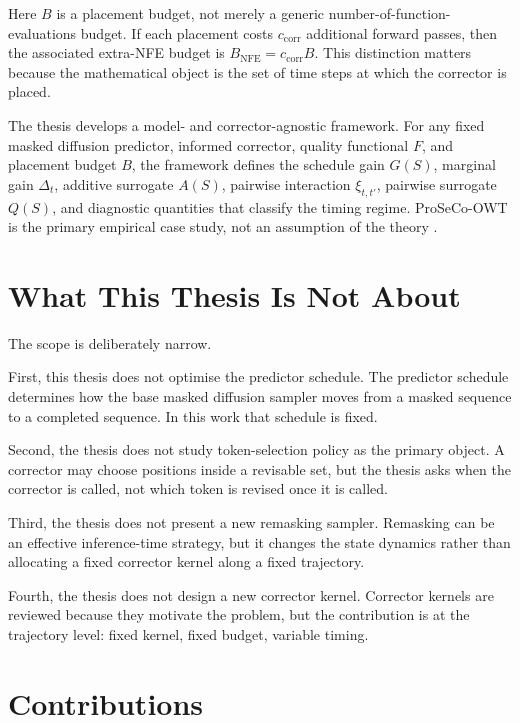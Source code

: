 Here $B$ is a placement budget, not merely a generic number-of-function-
evaluations budget. If each placement costs $c_{\mathrm{corr}}$ additional
forward passes, then the associated extra-NFE budget is
$B_{\mathrm{NFE}} = c_{\mathrm{corr}}B$. This distinction matters because the
mathematical object is the set of time steps at which the corrector is placed.

The thesis develops a model- and corrector-agnostic framework. For any fixed
masked diffusion predictor, informed corrector, quality functional $F$, and
placement budget $B$, the framework defines the schedule gain $G(S)$, marginal
gain $\Delta_t$, additive surrogate $A(S)$, pairwise interaction
$\xi_{t,t'}$, pairwise surrogate $Q(S)$, and diagnostic quantities that
classify the timing regime. ProSeCo-OWT is the primary empirical case study,
not an assumption of the theory \parencite{schiff2026proseco}.

\section{What This Thesis Is Not About}
\label{sec:ch1-non-goals}

The scope is deliberately narrow.

First, this thesis does not optimise the predictor schedule. The predictor
schedule determines how the base masked diffusion sampler moves from a masked
sequence to a completed sequence. In this work that schedule is fixed.

Second, the thesis does not study token-selection policy as the primary
object. A corrector may choose positions inside a revisable set, but the thesis
asks when the corrector is called, not which token is revised once it is called.

Third, the thesis does not present a new remasking sampler. Remasking can be an
effective inference-time strategy, but it changes the state dynamics rather
than allocating a fixed corrector kernel along a fixed trajectory.

Fourth, the thesis does not design a new corrector kernel. Corrector kernels
are reviewed because they motivate the problem, but the contribution is at the
trajectory level: fixed kernel, fixed budget, variable timing.

\section{Contributions}
\label{sec:ch1-contributions}

